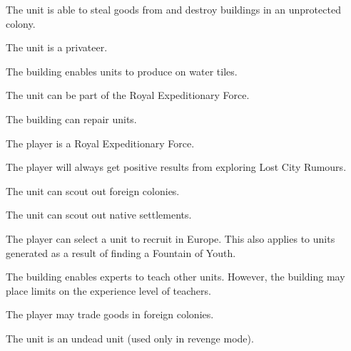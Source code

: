 \documentclass[12pt]{book}
\begin{document}
The unit is able to steal goods from and destroy buildings in an
unprotected colony.

\affectsUnit

The unit is a privateer.

\affectsBuilding

The building enables units to produce on water tiles.

\affectsUnit

The unit can be part of the Royal Expeditionary Force.

\affectsBuilding

The building can repair units.

\affectsPlayer

The player is a Royal Expeditionary Force.

\affectsPlayer

The player will always get positive results from exploring Lost City
Rumours.

\affectsUnit

The unit can scout out foreign colonies.

\affectsUnit

The unit can scout out native settlements.

\affectsPlayer

The player can select a unit to recruit in Europe. This also applies
to units generated as a result of finding a Fountain of Youth.

\affectsBuilding

The building enables experts to teach other units. However, the
building may place limits on the experience level of teachers.

\affectsPlayer

The player may trade goods in foreign colonies.

\affectsUnit

The unit is an undead unit (used only in revenge mode).





\affectsPlayer
\end{document}
